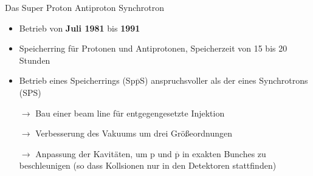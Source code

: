 \documentclass[aspectratio=1610, professionalfonts, 10pt]{beamer}
\begin{document}
\begin{frame}{Das Super Proton Antiproton Synchrotron}
				\begin{itemize}
					\setlength\itemsep{0.5em}
					\item Betrieb von \textbf{Juli 1981} bis \textbf{1991}
					\item Speicherring für Protonen und Antiprotonen, Speicherzeit von 15 bis 20 Stunden
					\item Betrieb eines Speicherrings (Sp$\overline{\text{p}}$S) anspruchsvoller als der eines Synchrotrons (SPS)
					\item[$\rightarrow$] Bau einer beam line für entgegengesetzte Injektion
					\item[$\rightarrow$] Verbesserung des Vakuums um drei Größeordnungen
					\item[$\rightarrow$] Anpassung der Kavitäten, um p und $\overline{\text{p}}$ in exakten Bunches zu beschleunigen (so dass Kollsionen nur in den Detektoren stattfinden)
				\end{itemize}
\end{frame}
\end{document}
